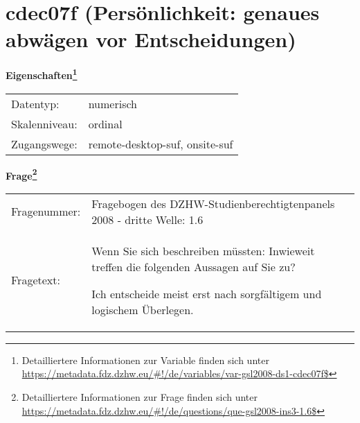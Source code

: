 
    \setcounter{footnote}{0}

    \vspace*{-1.8cm}
	\section{cdec07f (Persönlichkeit: genaues abwägen vor Entscheidungen)}
	\label{section:cdec07f}



    \vspace*{0.5cm}
    \noindent\textbf{Eigenschaften\footnote{Detailliertere Informationen zur Variable finden sich unter
		\url{https://metadata.fdz.dzhw.eu/\#!/de/variables/var-gsl2008-ds1-cdec07f$}}}\\
	\begin{tabularx}{\hsize}{@{}lX}
	Datentyp: & numerisch \\
	Skalenniveau: & ordinal \\
	Zugangswege: &
	  remote-desktop-suf, 
	  onsite-suf
 \\
    \end{tabularx}



				\vspace*{0.5cm}
                \noindent\textbf{Frage\footnote{Detailliertere Informationen zur Frage finden sich unter
		              \url{https://metadata.fdz.dzhw.eu/\#!/de/questions/que-gsl2008-ins3-1.6$}}}\\
				\begin{tabularx}{\hsize}{@{}lX}
					Fragenummer: &
					  Fragebogen des DZHW-Studienberechtigtenpanels 2008 - dritte Welle:
					  1.6
 \\
					Fragetext: & Wenn Sie sich beschreiben müssten: Inwieweit treffen die folgenden Aussagen auf Sie zu?\par  Ich entscheide meist erst nach sorgfältigem und logischem Überlegen. \\
				\end{tabularx}






